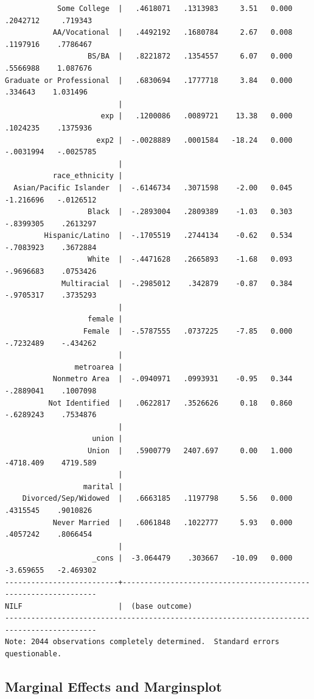 \documentclass[
]{book}
\begin{document}
\begin{verbatim}
            Some College  |   .4618071   .1313983     3.51   0.000     .2042712     .719343
           AA/Vocational  |   .4492192   .1680784     2.67   0.008     .1197916    .7786467
                   BS/BA  |   .8221872   .1354557     6.07   0.000     .5566988    1.087676
Graduate or Professional  |   .6830694   .1777718     3.84   0.000      .334643    1.031496
                          |
                      exp |   .1200086   .0089721    13.38   0.000     .1024235    .1375936
                     exp2 |  -.0028889   .0001584   -18.24   0.000    -.0031994   -.0025785
                          |
           race_ethnicity |
  Asian/Pacific Islander  |  -.6146734   .3071598    -2.00   0.045    -1.216696   -.0126512
                   Black  |  -.2893004   .2809389    -1.03   0.303    -.8399305    .2613297
         Hispanic/Latino  |  -.1705519   .2744134    -0.62   0.534    -.7083923    .3672884
                   White  |  -.4471628   .2665893    -1.68   0.093    -.9696683    .0753426
             Multiracial  |  -.2985012    .342879    -0.87   0.384    -.9705317    .3735293
                          |
                   female |
                  Female  |  -.5787555   .0737225    -7.85   0.000    -.7232489    -.434262
                          |
                metroarea |
           Nonmetro Area  |  -.0940971   .0993931    -0.95   0.344    -.2889041    .1007098
          Not Identified  |   .0622817   .3526626     0.18   0.860    -.6289243    .7534876
                          |
                    union |
                   Union  |   .5900779   2407.697     0.00   1.000    -4718.409    4719.589
                          |
                  marital |
    Divorced/Sep/Widowed  |   .6663185   .1197798     5.56   0.000     .4315545    .9010826
           Never Married  |   .6061848   .1022777     5.93   0.000     .4057242    .8066454
                          |
                    _cons |  -3.064479    .303667   -10.09   0.000    -3.659655   -2.469302
--------------------------+----------------------------------------------------------------
NILF                      |  (base outcome)
-------------------------------------------------------------------------------------------
Note: 2044 observations completely determined.  Standard errors questionable.
\end{verbatim}

\subsection{Marginal Effects and Marginsplot}\label{marginal-effects-and-marginsplot}
\end{document}

